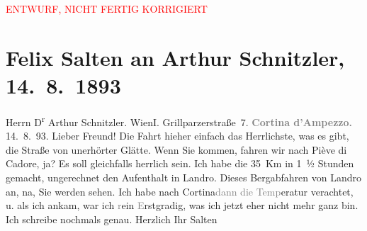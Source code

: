 
\begin{center}
            \textcolor{red}{ENTWURF, NICHT FERTIG KORRIGIERT}
                      \end{center}
            
         \renewcommand{\erwaehnteOrte}{Orte: Cortina d'Ampezzo, Grillparzerstraße, Höhlenstein, I., Innere Stadt, Pieve di Cadore, Wien}
         \renewcommand{\erwaehnteWerke}{}
               \section[Felix Salten an Arthur Schnitzler, 14. 8. 1893]{ Felix Salten an Arthur Schnitzler, 14. 8. 1893}\nopagebreak{}\rehead{ }\begin{ledgroupsized}[t]{13cm}\normalsize\beginnumbering \toendnotes[C]{\smallbreak\pagebreak[2]} 
\pstart{}{\pb}Herrn D\textsuperscript{r} Arthur Schnitzler. \pend{}\pstart{}Wien\pend{}\pstart{}I. Grillparzerstraße 7. \pend{}{\bigskip}\pstart
           \noindent{}\centering{}{\pb}\textcolor{gray}{\textbf{Cortina d’Ampezzo.}}\pend
           \pstart
           \raggedleft{}14. 8. 93. \pend
           \pstart
           Lieber Freund! Die Fahrt hieher einfach das Herrlichste, was es
               gibt, die Straße von unerhörter Glätte. Wenn Sie kommen, fahren wir nach Piève di Cadore, ja? Es soll gleichfalls
               herrlich sein. Ich habe die 35 Km in 1 ½ Stunden gemacht, ungerechnet den
               Aufenthalt in Landro. Dieses Bergabfahren von Landro an, na, Sie werden sehen. Ich habe nach Cortina\textcolor{gray}{dann die Temp}eratur verachtet, u. als ich ankam, war ich
                  \textcolor{gray}{r}ein \textcolor{gray}{E}rstgradig, was ich jetzt eher nicht
               mehr ganz bin. Ich schreibe nochmals genau. \pend
           \pstart Herzlich Ihr \spacefill\mbox{Salten}\pend{}
         
         \endnumbering{}\end{ledgroupsized}\begin{anhang}\end{anhang}\newcommand{\dateiname}{L03127}\newcommand{\titel}{Felix Salten an Arthur Schnitzler, 14. 8. 1893}\newcommand{\editorInnen}{Martin Anton Müller und Laura Untner}
      